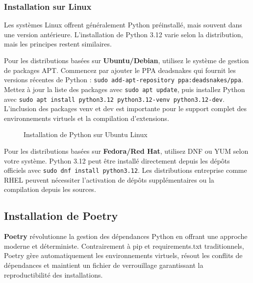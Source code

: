 \subsubsection{Installation sur Linux}

Les systèmes Linux offrent généralement Python préinstallé, mais souvent dans une version antérieure. L'installation de Python 3.12 varie selon la distribution, mais les principes restent similaires.

Pour les distributions basées sur \textbf{Ubuntu/Debian}, utilisez le système de gestion de packages APT. Commencez par ajouter le PPA deadsnakes qui fournit les versions récentes de Python : \texttt{sudo add-apt-repository ppa:deadsnakes/ppa}. Mettez à jour la liste des packages avec \texttt{sudo apt update}, puis installez Python avec \texttt{sudo apt install python3.12 python3.12-venv python3.12-dev}. L'inclusion des packages venv et dev est importante pour le support complet des environnements virtuels et la compilation d'extensions.

\begin{figure}[H]
\centering
{}
\caption{Installation de Python sur Ubuntu Linux}
\end{figure}

Pour les distributions basées sur \textbf{Fedora/Red Hat}, utilisez DNF ou YUM selon votre système. Python 3.12 peut être installé directement depuis les dépôts officiels avec \texttt{sudo dnf install python3.12}. Les distributions entreprise comme RHEL peuvent nécessiter l'activation de dépôts supplémentaires ou la compilation depuis les sources.

\subsection{Installation de Poetry}

\textbf{Poetry} révolutionne la gestion des dépendances Python en offrant une approche moderne et déterministe. Contrairement à pip et requirements.txt traditionnels, Poetry gère automatiquement les environnements virtuels, résout les conflits de dépendances et maintient un fichier de verrouillage garantissant la reproductibilité des installations.

